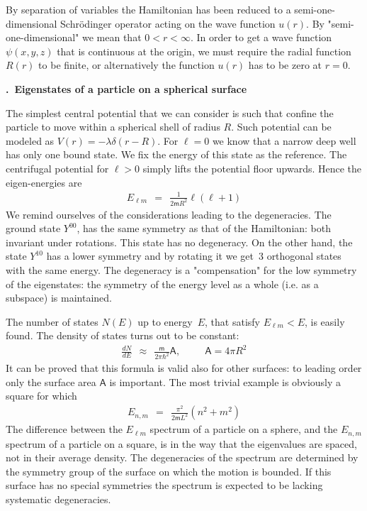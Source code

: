 \documentclass[onecolumn,fleqn, 11pt]{revtex4}
\newcommand{\mass}{\mathsf{m}}
\newcommand{\beq}{\begin{eqnarray}}
\newcommand{\eeq}{\end{eqnarray}}
\renewcommand{\thesubsection}{\arabic{subsection}}
\renewcommand{\thesubsubsection}{\arabic{subsubsection}}
\newcommand{\sheadC}[1]
{
\addtocounter{subsubsection}{1}
\vspace{5mm}
{\bf \thesubsection.\thesubsubsection \ #1}  
\nopagebreak
\phantomsection
}
\begin{document}
By separation of variables the Hamiltonian has 
been reduced to a semi-one-dimensional Schr\"{o}dinger operator 
acting on the wave function ${u(r)}$.   
By "semi-one-dimensional" we mean that ${0<r<\infty}$.  
In order to get a wave function ${\psi(x,y,z)}$ 
that is continuous at the origin, we must require  
the radial function ${R(r)}$ to be finite, 
or alternatively the function ${u(r)}$ has to be 
zero at ${r=0}$. 



 
\sheadC{Eigenstates of a particle on a spherical surface}

The simplest central potential that we can consider 
is such that confine the particle to move within 
a spherical shell of radius $R$. Such potential 
can be modeled as ${V(r)=-\lambda\delta(r-R)}$. 
For ${\ell=0}$ we know that a narrow deep well has 
only one bound state. We fix the energy of this state 
as the reference. The centrifugal potential 
for ${\ell>0}$ simply lifts the potential 
floor upwards. Hence the eigen-energies are 
\beq
E_{\ell m} \ \  = \ \   \frac{1}{2\mass R^2} \ell(\ell+1) 
\eeq
We remind ourselves of the considerations leading 
to the degeneracies. The ground state ${Y^{00}}$, 
has the same symmetry as that of the Hamiltonian: 
both invariant under rotations. 
This state has no degeneracy. On the other hand, 
the state ${Y^{10}}$ has a lower symmetry and by rotating 
it we get~3 orthogonal states with the same energy. 
The degeneracy is a "compensation" for the low symmetry 
of the eigenstates: the symmetry of the energy level 
as a whole (i.e. as a subspace) is maintained. 


The number of states ${N(E)}$ up to energy~$E$, 
that satisfy ${E_{\ell m}<E}$, is easily found. 
The density of states turns out to be constant:
\beq
\frac{dN}{dE} \ \   \approx \ \   \frac{\mass}{2\pi\hbar^2}\mathsf{A}, 
\ \ \ \ \ \ \ \ \ \ \  \mathsf{A}=4\pi R^2
\eeq
It can be proved that this formula is valid also for 
other surfaces: to leading order only the surface area $\mathsf{A}$ 
is important.  The most trivial example is obviously a square for which 
\beq
E_{n,m} 
\ \  = \ \   
\frac{\pi^2 }{2\mass L^2} (n^2+m^2) 
\eeq
The difference between the $E_{\ell m}$ spectrum 
of a particle on a sphere, and the $E_{n,m}$ spectrum 
of a particle on a square, is in the way that 
the eigenvalues are spaced, not in their average density.
The degeneracies of the spectrum are determined 
by the symmetry group of the surface on which the motion 
is bounded. If this surface has no special symmetries 
the spectrum is expected to be lacking systematic degeneracies. 
 
\end{document}
